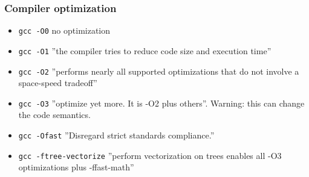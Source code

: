 \begin{frame}
\frametitle{Compiler optimization}

\begin{itemize}
	\item {\tt gcc -O0} no optimization
	\item {\tt gcc -O1} ''the compiler tries to reduce code size and execution time''
	\item {\tt gcc -O2} ''performs nearly all supported optimizations that do not involve a space-speed tradeoff''
	\item {\tt gcc -O3} ''optimize yet more. It is -O2 plus others''. Warning: this can change the code semantics.
	\item {\tt gcc -Ofast} ''Disregard strict standards compliance.''
	\item {\tt gcc -ftree-vectorize} ''perform vectorization on trees enables all -O3 optimizations plus -ffast-math''
\end{itemize}

\end{frame}





